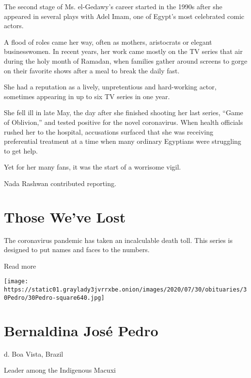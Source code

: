 The second stage of Ms. el-Gedawy's career started in the 1990s after
she appeared in several plays with Adel Imam, one of Egypt's most
celebrated comic actors.

A flood of roles came her way, often as mothers, aristocrats or elegant
businesswomen. In recent years, her work came mostly on the TV series
that air during the holy month of Ramadan, when families gather around
screens to gorge on their favorite shows after a meal to break the daily
fast.

She had a reputation as a lively, unpretentious and hard-working actor,
sometimes appearing in up to six TV series in one year.

She fell ill in late May, the day after she finished shooting her last
series, ``Game of Oblivion,'' and tested positive for the novel
coronavirus. When health officials rushed her to the hospital,
accusations surfaced that she was receiving preferential treatment at a
time when many ordinary Egyptians were struggling to get help.

Yet for her many fans, it was the start of a worrisome vigil.

Nada Rashwan contributed reporting.

\href{https://www.nytimes3xbfgragh.onion/interactive/2020/obituaries/people-died-coronavirus-obituaries.html?action=click\&pgtype=Article\&state=default\&region=BELOW_MAIN_CONTENT\&context=covid_obits_promo}{}

\hypertarget{those-weve-lost}{%
\section{Those We've Lost}\label{those-weve-lost}}

The coronavirus pandemic has taken an incalculable death toll. This
series is designed to put names and faces to the numbers.

Read more

\texttt{[image: https://static01.graylady3jvrrxbe.onion/images/2020/07/30/obituaries/30Pedro/30Pedro-square640.jpg]}

\hypertarget{bernaldina-josuxe9-pedro}{%
\section{Bernaldina José Pedro}\label{bernaldina-josuxe9-pedro}}

d. Boa Vista, Brazil

Leader among the Indigenous Macuxi

